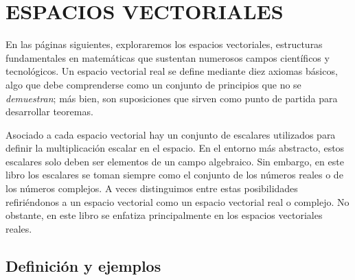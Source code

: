 \chapter{ESPACIOS VECTORIALES}\label{chap:ev}

\printchaptertableofcontents

En las páginas siguientes, exploraremos los espacios vectoriales, estructuras fundamentales en matemáticas que sustentan numerosos campos científicos y tecnológicos. Un espacio vectorial real se define mediante diez axiomas básicos, algo que debe comprenderse como un conjunto de principios que no se \emph{demuestran}; más bien, son suposiciones que sirven como punto de partida para desarrollar teoremas.

Asociado a cada espacio vectorial hay un conjunto de escalares utilizados para definir la multiplicación escalar en el espacio. En el entorno más abstracto, estos escalares solo deben ser elementos de un campo algebraico. Sin embargo, en este libro los escalares se toman siempre como el conjunto de los números reales o de los números complejos. A veces distinguimos entre estas posibilidades refiriéndonos a un espacio vectorial como un espacio vectorial real o complejo. No obstante, en este libro se enfatiza principalmente en los espacios vectoriales reales.

\section{Definición y ejemplos}

